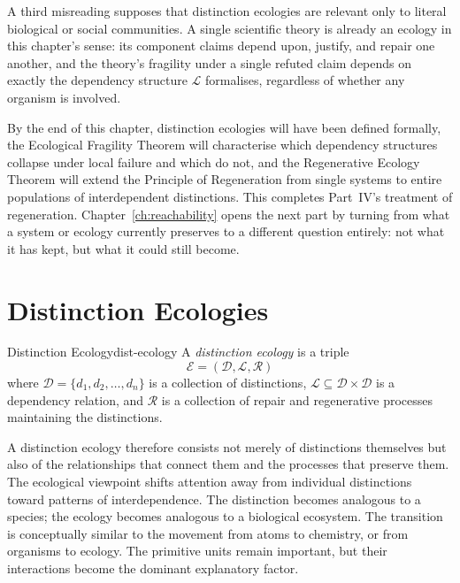 \documentclass[12pt,twoside,openright]{book}
\begin{document}
A third misreading supposes that distinction ecologies are
relevant only to literal biological or social communities. A
single scientific theory is already an ecology in this
chapter's sense: its component claims depend upon, justify,
and repair one another, and the theory's fragility under a
single refuted claim depends on exactly the dependency
structure $\mathcal{L}$ formalises, regardless of whether any
organism is involved.

By the end of this chapter, distinction ecologies will have
been defined formally, the Ecological Fragility Theorem will
characterise which dependency structures collapse under
local failure and which do not, and the Regenerative Ecology
Theorem will extend the Principle of Regeneration from single
systems to entire populations of interdependent distinctions.
This completes Part~IV's treatment of regeneration.
Chapter~\ref{ch:reachability} opens the next part by turning
from what a system or ecology currently preserves to a
different question entirely: not what it has kept, but what
it could still become.

\section{Distinction Ecologies}
\label{sec:ch12-ecologies}

\begin{definition}{Distinction Ecology}{dist-ecology}
  A \emph{distinction ecology} is a triple
  \[
    \mathcal{E} = (\mathcal{D}, \mathcal{L}, \mathcal{R})
  \]
  where $\mathcal{D} = \{d_1,d_2,\ldots,d_n\}$ is a
  collection of distinctions, $\mathcal{L} \subseteq
  \mathcal{D}\times\mathcal{D}$ is a dependency relation,
  and $\mathcal{R}$ is a collection of repair and
  regenerative processes maintaining the distinctions.
\end{definition}

A distinction ecology therefore consists not merely of
distinctions themselves but also of the relationships that
connect them and the processes that preserve them. The
ecological viewpoint shifts attention away from individual
distinctions toward patterns of interdependence. The
distinction becomes analogous to a species; the ecology
becomes analogous to a biological ecosystem. The transition
is conceptually similar to the movement from atoms to
chemistry, or from organisms to ecology. The primitive
units remain important, but their interactions become the
dominant explanatory factor.
\end{document}
